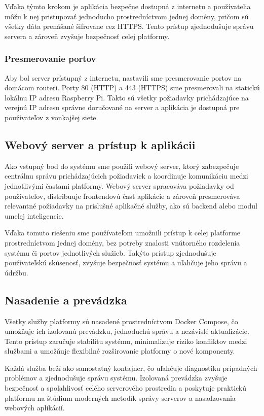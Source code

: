 Vďaka týmto krokom je aplikácia bezpečne dostupná z internetu a používatelia môžu k nej pristupovať jednoducho prostredníctvom jednej domény, pričom sú všetky dáta prenášané šifrovane cez HTTPS. Tento prístup zjednodušuje správu servera a zároveň zvyšuje bezpečnosť celej platformy.

\subsubsection{Presmerovanie portov}

Aby bol server prístupný z internetu, nastavili sme presmerovanie portov na domácom routeri. Porty 80 (HTTP) a 443 (HTTPS) sme presmerovali na statickú lokálnu IP adresu Raspberry Pi. Takto sú všetky požiadavky prichádzajúce na verejnú IP adresu správne doručované na server a aplikácia je dostupná pre používateľov z vonkajšej siete.

\subsection{Webový server a prístup k aplikácii}

Ako vstupný bod do systému sme použili webový server, ktorý zabezpečuje centrálnu správu prichádzajúcich požiadaviek a koordinuje komunikáciu medzi jednotlivými časťami platformy. Webový server spracováva požiadavky od používateľov, distribuuje frontendovú časť aplikácie a zároveň presmerováva relevantné požiadavky na príslušné aplikačné služby, ako sú backend alebo modul umelej inteligencie.

Vďaka tomuto riešeniu sme používateľom umožnili prístup k celej platforme prostredníctvom jednej domény, bez potreby znalosti vnútorného rozdelenia systému či portov jednotlivých služieb. Takýto prístup zjednodušuje používateľskú skúsenosť, zvyšuje bezpečnosť systému a uľahčuje jeho správu a údržbu.

\subsection{Nasadenie a prevádzka}

Všetky služby platformy sú nasadené prostredníctvom Docker Compose, čo umožňuje ich izolovanú prevádzku, jednoduchú správu a nezávislé aktualizácie. Tento prístup zaručuje stabilitu systému, minimalizuje riziko konfliktov medzi službami a umožňuje flexibilné rozširovanie platformy o nové komponenty.

Každá služba beží ako samostatný kontajner, čo uľahčuje diagnostiku prípadných problémov a zjednodušuje správu systému. Izolovaná prevádzka zvyšuje bezpečnosť a spoľahlivosť celého serverového prostredia a poskytuje praktickú platformu na štúdium moderných metodík správy serverov a nasadzovania webových aplikácií.
